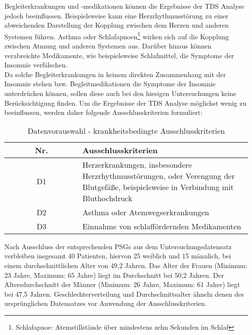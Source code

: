 Begleiterkrankungen und -medikationen können die Ergebnisse der \acs{TDS} Analyse jedoch beeinflussen. Beispielsweise kann eine Herzrhythmusstörung zu einer abweichenden Darstellung der Kopplung zwischen dem Herzen und anderen Systemen führen. Asthma oder Schlafapnoen\footnote{Schlafapnoe: Atemstillstände über mindestens zehn Sekunden im Schlaf} wirken sich auf die Kopplung zwischen Atmung und anderen Systemen aus. Darüber hinaus können verabreichte Medikamente, wie beispielsweise Schlafmittel, die Symptome der Insomnie verfälschen.\\

Da solche Begleiterkrankungen in keinem direkten Zusammenhang mit der Insomnie stehen bzw. Begleitmedikationen die Symptome der Insomnie unterdrücken können, sollen diese auch bei den hiesigen Untersuchungen keine Berücksichtigung finden. Um die Ergebnisse der \acs{TDS} Analyse möglichst wenig zu beeinflussen, werden daher folgende Ausschlusskriterien formuliert:\\


\begin{table}[H] 
\begin{tabularx}{\textwidth}{cX}
\toprule
\multicolumn{1}{c}{\textbf{~~~~~~Nr.~~~~~~}} & \multicolumn{1}{l}{\textbf{Ausschlusskriterien}}\\
\midrule 
D1 & Herzerkrankungen, insbesondere Herzrhythmusstörungen, oder Verengung der Blutgefäße, beispielsweise in Verbindung mit Bluthochdruck\\
D2 & Asthma oder Atemwegserkrankungen\\
D3 & Einnahme von schlaffördernden Medikamenten\\
\bottomrule
\end{tabularx}
\caption[Datenvorauswahl - krankheitsbedingte Ausschlusskriterien]{Datenvorauswahl - krankheitsbedingte Ausschlusskriterien}
\label{tab:Datenanalyse-krank}
\end{table}


Nach Ausschluss der entsprechenden \acs{PSG}s aus dem Untersuchungsdatensatz verbleiben insgesamt 40 Patienten, hiervon 25 weiblich und 15 männlich, bei einem durchschnittlichen Alter von 49,2 Jahren. Das Alter der Frauen (Minimum: 23 Jahre, Maximum: 65 Jahre) liegt im Durchschnitt bei 50,2 Jahren. Der Altersdurchschnitt der Männer (Minimum: 26 Jahre, Maximum: 61 Jahre) liegt bei 47,5 Jahren. Geschlechterverteilung und Durchschnittsalter ähneln denen des ursprünglichen Datensatzes vor Anwendung der Ausschlusskriterien.\\

